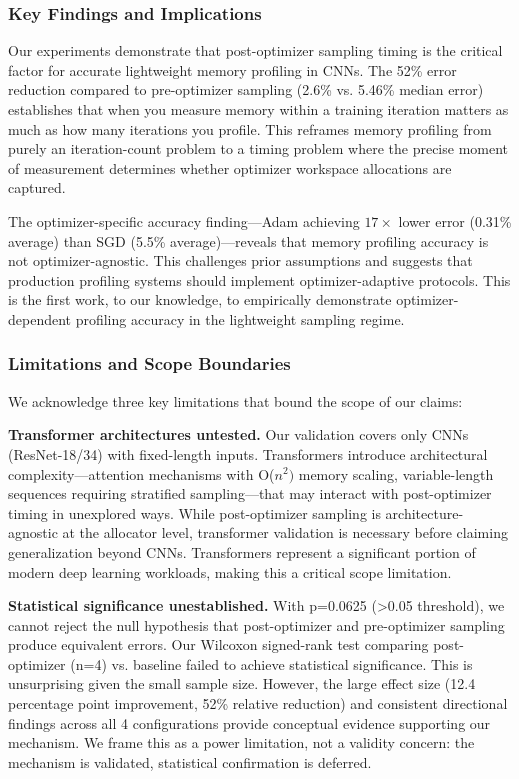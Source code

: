 
\subsubsection{Key Findings and Implications}

Our experiments demonstrate that post-optimizer sampling timing is the critical factor for accurate lightweight memory profiling in CNNs. The 52\% error reduction compared to pre-optimizer sampling (2.6\% vs. 5.46\% median error) establishes that when you measure memory within a training iteration matters as much as how many iterations you profile. This reframes memory profiling from purely an iteration-count problem to a timing problem where the precise moment of measurement determines whether optimizer workspace allocations are captured.

The optimizer-specific accuracy finding---Adam achieving $17\times$ lower error (0.31\% average) than SGD (5.5\% average)---reveals that memory profiling accuracy is not optimizer-agnostic. This challenges prior assumptions and suggests that production profiling systems should implement optimizer-adaptive protocols. This is the first work, to our knowledge, to empirically demonstrate optimizer-dependent profiling accuracy in the lightweight sampling regime.

\subsubsection{Limitations and Scope Boundaries}

We acknowledge three key limitations that bound the scope of our claims:

\textbf{Transformer architectures untested.} Our validation covers only CNNs (ResNet-18/34) with fixed-length inputs. Transformers introduce architectural complexity---attention mechanisms with O($n^{2})$ memory scaling, variable-length sequences requiring stratified sampling---that may interact with post-optimizer timing in unexplored ways. While post-optimizer sampling is architecture-agnostic at the allocator level, transformer validation is necessary before claiming generalization beyond CNNs. Transformers represent a significant portion of modern deep learning workloads, making this a critical scope limitation.

\textbf{Statistical significance unestablished.} With p=0.0625 (>0.05 threshold), we cannot reject the null hypothesis that post-optimizer and pre-optimizer sampling produce equivalent errors. Our Wilcoxon signed-rank test comparing post-optimizer (n=4) vs. baseline failed to achieve statistical significance. This is unsurprising given the small sample size. However, the large effect size (12.4 percentage point improvement, 52\% relative reduction) and consistent directional findings across all 4 configurations provide conceptual evidence supporting our mechanism. We frame this as a power limitation, not a validity concern: the mechanism is validated, statistical confirmation is deferred.

